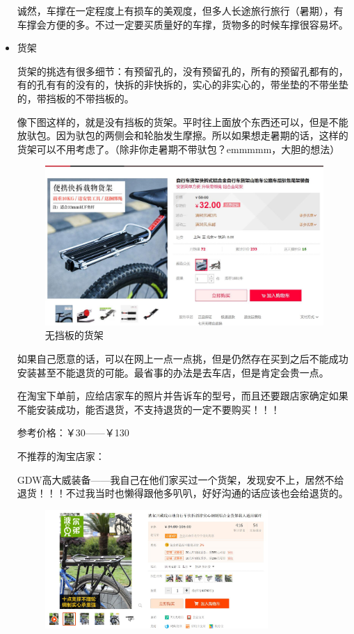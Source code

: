 \documentclass{ctexbook}
\begin{document}
\begin{itemize}
        诚然，车撑在一定程度上有损车的美观度，但多人长途旅行旅行（暑期），有车撑会方便的多。不过一定要买质量好的车撑，货物多的时候车撑很容易坏。
        
        \item 货架

        货架的挑选有很多细节：有预留孔的，没有预留孔的，所有的预留孔都有的，有的孔有有的没有的，快拆的非快拆的，实心的非实心的，带坐垫的不带坐垫的，带挡板的不带挡板的。

        像下图这样的，就是没有挡板的货架。平时往上面放个东西还可以，但是不能放驮包。因为驮包的两侧会和轮胎发生摩擦。所以如果想走暑期的话，这样的货架可以不用考虑了。（除非你走暑期不带驮包？emmmmm，大胆的想法）
        \begin{figure}[H]
            \centering
            \includegraphics[width=0.7\linewidth]{fig/货架_无挡板}
            \caption{无挡板的货架}
        \end{figure}
        
        如果自己愿意的话，可以在网上一点一点挑，但是仍然存在买到之后不能成功安装甚至不能退货的可能。最省事的办法是去车店，但是肯定会贵一点。
        
        在淘宝下单前，应给店家车的照片并告诉车的型号，而且还要跟店家确定如果不能安装成功，能否退货，不支持退货的一定不要购买！！！

        参考价格：￥30——￥130

        不推荐的淘宝店家：
        
        GDW高大威装备——我自己在他们家买过一个货架，发现安不上，居然不给退货！！！不过我当时也懒得跟他多叭叭，好好沟通的话应该也会给退货的。
        
        \begin{figure}[ht]
            \begin{center}
            \includegraphics[width = 0.8\textwidth]{fig/波尔兄弟_货架.jpg}
            \end{center}
        \end{figure}


\end{itemize}
\end{document}
